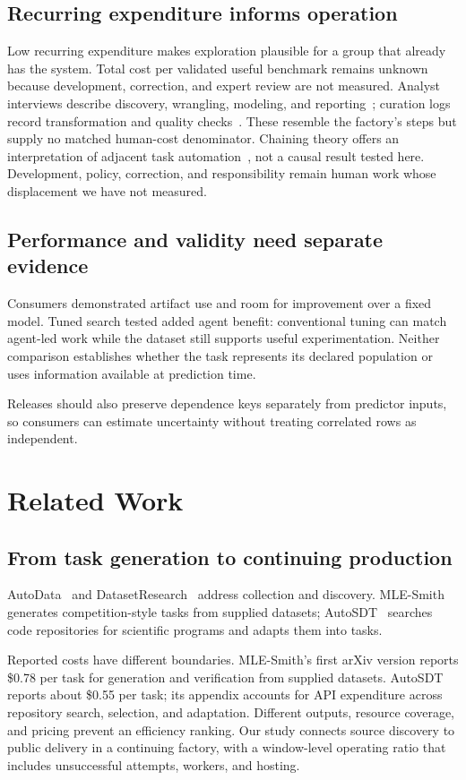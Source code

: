 \documentclass[conference,10pt,letterpaper]{IEEEtran}
\begin{document}
\subsection{Recurring expenditure informs operation}
Low recurring expenditure makes exploration plausible for a group that already has the system. Total cost per validated useful benchmark remains unknown because development, correction, and expert review are not measured. Analyst interviews describe discovery, wrangling, modeling, and reporting~\cite{kandel}; curation logs record transformation and quality checks~\cite{lafia}. These resemble the factory's steps but supply no matched human-cost denominator. Chaining theory offers an interpretation of adjacent task automation~\cite{chaining}, not a causal result tested here. Development, policy, correction, and responsibility remain human work whose displacement we have not measured.

\subsection{Performance and validity need separate evidence}
Consumers demonstrated artifact use and room for improvement over a fixed model. Tuned search tested added agent benefit: conventional tuning can match agent-led work while the dataset still supports useful experimentation. Neither comparison establishes whether the task represents its declared population or uses information available at prediction time.

Releases should also preserve dependence keys separately from predictor inputs, so consumers can estimate uncertainty without treating correlated rows as independent.

\section{Related Work}
\subsection{From task generation to continuing production}
AutoData~\cite{autodata-web} and DatasetResearch~\cite{datasetresearch} address collection and discovery. MLE-Smith~\cite{qiang2026mlesmith} generates competition-style tasks from supplied datasets; AutoSDT~\cite{autosdt} searches code repositories for scientific programs and adapts them into tasks.

Reported costs have different boundaries. MLE-Smith's first arXiv version reports \$0.78 per task for generation and verification from supplied datasets. AutoSDT reports about \$0.55 per task; its appendix accounts for API expenditure across repository search, selection, and adaptation. Different outputs, resource coverage, and pricing prevent an efficiency ranking. Our study connects source discovery to public delivery in a continuing factory, with a window-level operating ratio that includes unsuccessful attempts, workers, and hosting.
\end{document}
